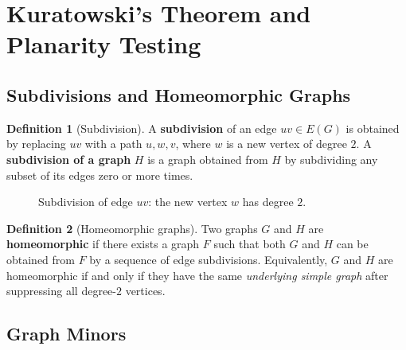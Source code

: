 \documentclass[12pt,a4paper]{article}
\theoremstyle{definition}
\newtheorem{definition}{Definition}[section]
\theoremstyle{plain}
\theoremstyle{remark}
\begin{document}
\section{Kuratowski's Theorem and Planarity Testing}
\label{sec:kuratowski}

\subsection{Subdivisions and Homeomorphic Graphs}

\begin{definition}[Subdivision]\label{def:subdivision}
  A \textbf{subdivision} of an edge $uv \in E(G)$ is obtained by replacing $uv$
  with a path $u,w,v$, where $w$ is a new vertex of degree $2$.  A
  \textbf{subdivision of a graph} $H$ is a graph obtained from $H$ by
  subdividing any subset of its edges zero or more times.
\end{definition}

\begin{figure}[htbp]
  \centering
  \caption{Subdivision of edge $uv$: the new vertex $w$ has degree $2$.}
  \label{fig:subdivision}
\end{figure}

\begin{definition}[Homeomorphic graphs]\label{def:homeomorphic}
  Two graphs $G$ and $H$ are \textbf{homeomorphic} if there exists a graph
  $F$ such that both $G$ and $H$ can be obtained from $F$ by a sequence of
  edge subdivisions.  Equivalently, $G$ and $H$ are homeomorphic if and only
  if they have the same \emph{underlying simple graph} after suppressing all
  degree-$2$ vertices.
\end{definition}

\subsection{Graph Minors}
\end{document}
